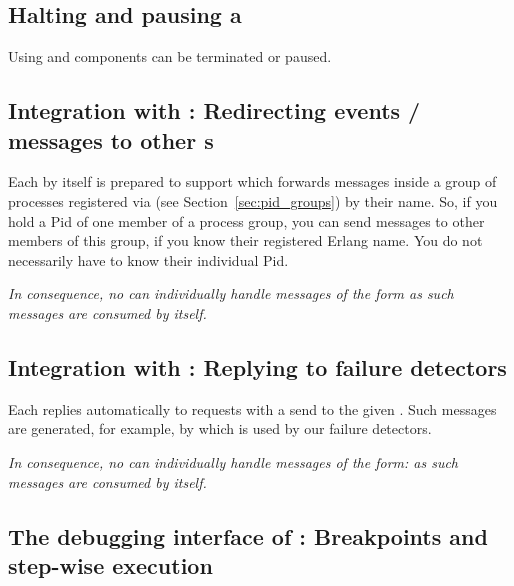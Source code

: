 \subsection{\texorpdfstring{Halting and pausing a }
{Halting and pausing a gen\_component}}

Using  and
 components can be terminated or
paused.

\subsection{\texorpdfstring{Integration with :
  Redirecting events / messages  to other s}
  {Integration with pid\_groups:
  Redirecting events / messages  to other gen\_components}}

Each  by itself is prepared to support
 which forwards messages inside a
group of processes registered via  (see
Section~\ref{sec:pid_groups}) by their name. So, if you hold a Pid
of one member of a process group, you can send messages to other members of
this group, if you know their registered Erlang name. You do not necessarily
have to know their individual Pid.

\emph{In consequence, no  can individually handle
  messages of the form  \code{_, _\}} as such
  messages are consumed by  itself.}

\subsection{\texorpdfstring{Integration with :
  Replying to failure detectors}
  {Integration with fd\_pinger: Replying to failure detectors}}

Each  replies automatically to  requests with a  send to the given .  Such
messages are generated, for example, by  which is used
by our  failure detectors.

\emph{In consequence, no  can individually handle
messages of the form:  as such messages are consumed by
 itself.}


\subsection{\texorpdfstring{The debugging interface of :
  Breakpoints and step-wise execution}
  {The debugging interface of gen\_component: Breakpoints and step-wise execution}}

